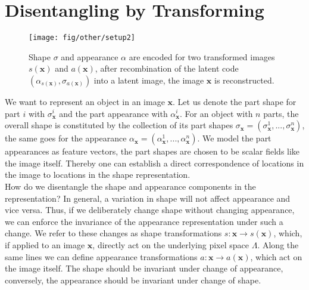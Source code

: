 \section{Disentangling by Transforming}\label{sec:framework}
	\begin{figure}[t]
		\centering
		\texttt{[image: fig/other/setup2]}
		\caption{Shape $\sigma$ and appearance $\alpha$ are encoded for two transformed images $s(\mathbf{x})$ and $a(\mathbf{x})$, after recombination of the latent code $({\alpha}_{s(\mathbf{x})}, {\sigma}_{a(\mathbf{x})})$ into a latent image, the image $\mathbf{x}$ is reconstructed.}
		\label{fig:architecture}
	\end{figure}
	We want to represent an object in an image $\mathbf{x}$. Let us denote the part shape for part $i$ with ${\sigma}^i_\mathbf{x}$ and the part appearance with ${\alpha}^i_\mathbf{x}$. For an object with $n$ parts, the overall shape is constituted by the collection of its part shapes ${\sigma}_\mathbf{x} =  ({\sigma}^1_\mathbf{x}, ...,  {\sigma}^n_\mathbf{x})$, the same goes for the appearance ${\alpha}_\mathbf{x} =  (\alpha^1_\mathbf{x}, ...,  \alpha^n_\mathbf{x})$. We model the part appearances as feature vectors, the part shapes are chosen to be scalar fields like the image itself. Thereby one can establish a direct correspondence of locations in the image to locations in the shape representation.\\
	How do we disentangle the shape and appearance components in the representation? In general, a variation in shape will not affect appearance and vice versa. Thus, if we deliberately change shape without changing appearance, we can enforce the invariance of the appearance representation under such a change.
	We refer to these changes as shape transformations $s: \mathbf{x} \rightarrow s(\mathbf{x})$, which, if applied to an image $\mathbf{x}$, directly act on the underlying pixel space $\Lambda$.
	Along the same lines we can define appearance transformations $a: \mathbf{x} \rightarrow a(\mathbf{x})$, which act on the image itself.
	The shape should be invariant under change of appearance, conversely, the appearance should be invariant under change of shape.
